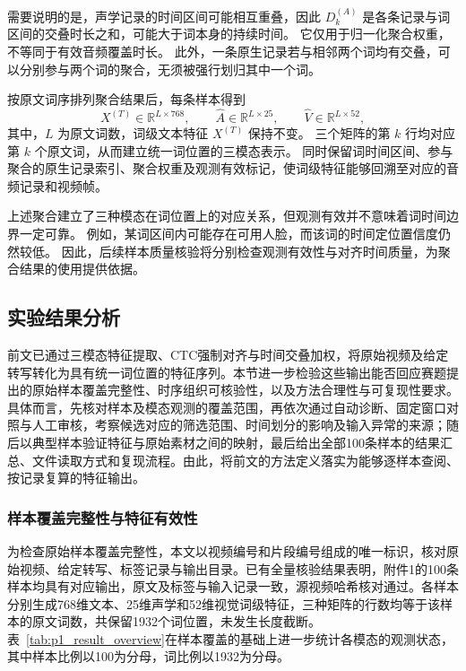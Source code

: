 需要说明的是，声学记录的时间区间可能相互重叠，因此
$D_k^{(A)}$ 是各条记录与词区间的交叠时长之和，可能大于词本身的持续时间。
它仅用于归一化聚合权重，不等同于有效音频覆盖时长。
此外，一条原生记录若与相邻两个词均有交叠，可以分别参与两个词的聚合，无须被强行划归其中一个词。

按原文词序排列聚合结果后，每条样本得到
\begin{equation}
X^{(T)}\in\mathbb{R}^{L\times768},
\qquad
\widehat{A}\in\mathbb{R}^{L\times25},
\qquad
\widehat{V}\in\mathbb{R}^{L\times52},
\label{eq:p1_aligned_feature_matrices}
\end{equation}
其中，$L$ 为原文词数，词级文本特征 $X^{(T)}$ 保持不变。
三个矩阵的第 $k$ 行均对应第 $k$ 个原文词，从而建立统一词位置的三模态表示。
同时保留词时间区间、参与聚合的原生记录索引、聚合权重及观测有效标记，使词级特征能够回溯至对应的音频记录和视频帧。

上述聚合建立了三种模态在词位置上的对应关系，但观测有效并不意味着词时间边界一定可靠。
例如，某词区间内可能存在可用人脸，而该词的时间定位置信度仍然较低。
因此，后续样本质量核验将分别检查观测有效性与对齐时间质量，为聚合结果的使用提供依据。

\subsection{实验结果分析}
\label{sec:p1_results}

前文已通过三模态特征提取、CTC强制对齐与时间交叠加权，将原始视频及给定转写转化为具有统一词位置的特征序列。本节进一步检验这些输出能否回应赛题提出的原始样本覆盖完整性、时序组织可核验性，以及方法合理性与可复现性要求。具体而言，先核对样本及模态观测的覆盖范围，再依次通过自动诊断、固定窗口对照与人工审核，考察候选对应的筛选范围、时间划分的影响及输入异常的来源；随后以典型样本验证特征与原始素材之间的映射，最后给出全部100条样本的结果汇总、文件读取方式和复现流程。由此，将前文的方法定义落实为能够逐样本查阅、按记录复算的特征输出。

\subsubsection{样本覆盖完整性与特征有效性}
\label{sec:p1_quality_scope}

为检查原始样本覆盖完整性，本文以视频编号和片段编号组成的唯一标识，核对原始视频、给定转写、标签记录与输出目录。已有全量核验结果表明，附件1的100条样本均具有对应输出，原文及标签与输入记录一致，源视频哈希核对通过。各样本分别生成768维文本、25维声学和52维视觉词级特征，三种矩阵的行数均等于该样本的原文词数，共保留1932个词位置，未发生长度截断。表~\ref{tab:p1_result_overview}在样本覆盖的基础上进一步统计各模态的观测状态，其中样本比例以100为分母，词比例以1932为分母。

